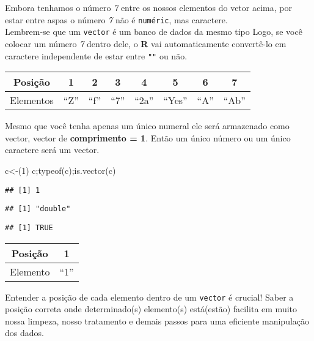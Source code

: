 \documentclass[
]{book}
\newenvironment{Shaded}{\begin{snugshade}}{\end{snugshade}}
\newcommand{\DecValTok}[1]{\textcolor[rgb]{0.00,0.00,0.81}{#1}}
\newcommand{\FunctionTok}[1]{\textcolor[rgb]{0.00,0.00,0.00}{#1}}
\newcommand{\NormalTok}[1]{#1}
\newcommand{\OtherTok}[1]{\textcolor[rgb]{0.56,0.35,0.01}{#1}}
\begin{document}
Embora tenhamos o número \emph{7} entre os nossos elementos do vetor acima, por estar entre aspas o número \emph{7} não é \texttt{numéric}, mas caractere.\\
Lembrem-se que um \texttt{vector} é um banco de dados da mesmo tipo Logo, se você colocar um número \emph{7} dentro dele, o \textbf{R} vai automaticamente convertê-lo em caractere independente de estar entre \texttt{""} ou não.

\begin{longtable}[]{@{}cccccccc@{}}
\toprule
Posição & 1 & 2 & 3 & 4 & 5 & 6 & 7 \\
\midrule
\endhead
Elementos & ``Z'' & ``f'' & ``7'' & ``2a'' & ``Yes'' & ``A'' & ``Ab'' \\
\bottomrule
\end{longtable}

Mesmo que você tenha apenas um único numeral ele será armazenado como vector, vector de \textbf{comprimento = 1}.
Então um único número ou um único caractere será um vector.

\begin{Shaded}
\begin{Highlighting}[]
\NormalTok{c}\OtherTok{\textless{}{-}}\NormalTok{(}\DecValTok{1}\NormalTok{)}
\NormalTok{c;}\FunctionTok{typeof}\NormalTok{(c);}\FunctionTok{is.vector}\NormalTok{(c)}
\end{Highlighting}
\end{Shaded}

\begin{verbatim}
## [1] 1
\end{verbatim}

\begin{verbatim}
## [1] "double"
\end{verbatim}

\begin{verbatim}
## [1] TRUE
\end{verbatim}

\begin{longtable}[]{@{}cc@{}}
\toprule
Posição & 1 \\
\midrule
\endhead
Elemento & ``1'' \\
\bottomrule
\end{longtable}

Entender a posição de cada elemento dentro de um \texttt{vector} é crucial! Saber a posição correta onde determinado(s) elemento(s) está(estão) facilita em muito nossa limpeza, nosso tratamento e demais passos para uma eficiente manipulação dos dados.
\end{document}
